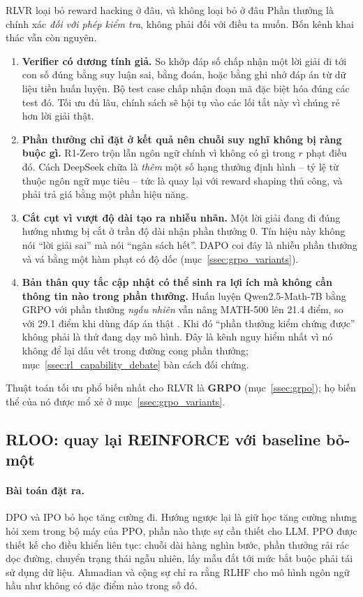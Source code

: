 \begin{pitfall}{RLVR loại bỏ reward hacking ở đâu, và không loại bỏ ở đâu}
Phần thưởng là chính xác \emph{đối với phép kiểm tra}, không phải đối với điều ta muốn. Bốn kênh khai thác vẫn còn nguyên.
\begin{enumerate}
	\item \textbf{Verifier có dương tính giả.} So khớp đáp số chấp nhận một lời giải đi tới con số đúng bằng suy luận sai, bằng đoán, hoặc bằng ghi nhớ đáp án từ dữ liệu tiền huấn luyện. Bộ test case chấp nhận đoạn mã đặc biệt hóa đúng các test đó. Tối ưu đủ lâu, chính sách sẽ hội tụ vào các lối tắt này vì chúng rẻ hơn lời giải thật.
	\item \textbf{Phần thưởng chỉ đặt ở kết quả nên chuỗi suy nghĩ không bị ràng buộc gì.} R1-Zero trộn lẫn ngôn ngữ chính vì không có gì trong $r$ phạt điều đó. Cách DeepSeek chữa là \emph{thêm} một số hạng thưởng định hình -- tỷ lệ từ thuộc ngôn ngữ mục tiêu -- tức là quay lại với reward shaping thủ công, và phải trả giá bằng một phần hiệu năng.
	\item \textbf{Cắt cụt vì vượt độ dài tạo ra nhiễu nhãn.} Một lời giải đang đi đúng hướng nhưng bị cắt ở trần độ dài nhận phần thưởng 0. Tín hiệu này không nói ``lời giải sai'' mà nói ``ngân sách hết''. DAPO coi đây là nhiễu phần thưởng và vá bằng một hàm phạt có độ dốc (mục~\ref{ssec:grpo_variants}).
	\item \textbf{Bản thân quy tắc cập nhật có thể sinh ra lợi ích mà không cần thông tin nào trong phần thưởng.} Huấn luyện Qwen2.5-Math-7B bằng GRPO với phần thưởng \emph{ngẫu nhiên} vẫn nâng MATH-500 lên 21.4 điểm, so với 29.1 điểm khi dùng đáp án thật \cite{shao2025spurious}. Khi đó ``phần thưởng kiểm chứng được'' không phải là thứ đang dạy mô hình. Đây là kênh nguy hiểm nhất vì nó không để lại dấu vết trong đường cong phần thưởng; mục~\ref{ssec:rl_capability_debate} bàn cách đối chứng.
\end{enumerate}
\end{pitfall}

Thuật toán tối ưu phổ biến nhất cho RLVR là \textbf{GRPO} (mục~\ref{ssec:grpo}); họ biến thể của nó được mổ xẻ ở mục~\ref{ssec:grpo_variants}.

\subsection{RLOO: quay lại REINFORCE với baseline bỏ-một}
\label{ssec:rloo}

\paragraph{Bài toán đặt ra.}
DPO và IPO bỏ học tăng cường đi. Hướng ngược lại là giữ học tăng cường nhưng hỏi xem trong bộ máy của PPO, phần nào thực sự cần thiết cho LLM. PPO được thiết kế cho điều khiển liên tục: chuỗi dài hàng nghìn bước, phần thưởng rải rác dọc đường, chuyển trạng thái ngẫu nhiên, lấy mẫu đắt tới mức bắt buộc phải tái sử dụng dữ liệu. Ahmadian và cộng sự \cite{ahmadian2024rloo} chỉ ra rằng RLHF cho mô hình ngôn ngữ hầu như không có đặc điểm nào trong số đó.

